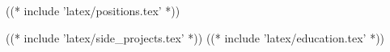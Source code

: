 \documentclass[10pt]{barag_resume}
\begin{document}
    ((* include 'latex/positions.tex' *))

    ((* include 'latex/side_projects.tex' *))
    \newpage %
    ((* include 'latex/education.tex' *))
\end{document}
